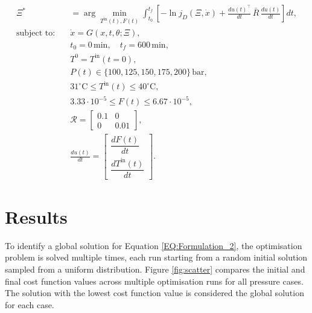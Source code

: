 \documentclass[a4paper,fleqn]{cas-dc}
\begin{document}
		{\footnotesize 
			\begin{equation}
				\begin{aligned}
					\Xi^* &= \arg \min_{T^{\text{in}}(t), F(t)} 
					\int_{t_0}^{t_f} \left[ - \ln j_D(\Xi, \dot{x}) + 
					\frac{du(t)^\top}{dt} \, \bar{R} \, \frac{du(t)}{dt} \right] dt, \\
					\text{subject to:} \quad 
					& \dot{x} = G(x, t, \theta; \Xi), \\
					& t_0 = 0 \, \text{min}, \quad t_f = 600 \, \text{min}, \\
					& T^0 = T^{\text{in}}(t=0), \\
					& P(t) \in \{100, 125, 150, 175, 200\} \, \text{bar}, \\
					& 31^\circ\text{C} \leq T^{\text{in}}(t) \leq 40^\circ\text{C}, \\
					& 3.33 \cdot 10^{-5} \leq F(t) \leq 6.67 \cdot 10^{-5}, \\
					& \mathcal{R} = 
					\begin{bmatrix} 
						0.1 & 0 \\ 
						0 & 0.01 
					\end{bmatrix}, \\
					& \frac{du(t)}{dt} = 
					\begin{bmatrix} 
						\dfrac{dF(t)}{dt} \\ 
						\dfrac{dT^{\text{in}}(t)}{dt} 
					\end{bmatrix}.
				\end{aligned}
				\label{EQ:Formulation_2}
		\end{equation} }
		
		
		\section{Results}
		To identify a global solution for Equation \ref{EQ:Formulation_2}, the optimisation problem is solved multiple times, each run starting from a random initial solution sampled from a uniform distribution. Figure \ref{fig:scatter} compares the initial and final cost function values across multiple optimisation runs for all pressure cases. The solution with the lowest cost function value is considered the global solution for each case.
		
\end{document}
